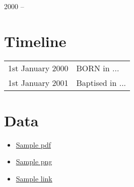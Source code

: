 \begin{center}
\huge{2000 --}
\end{center}

\vspace{1in}

\begin{center}
\end{center}

\newpage
\section{Timeline}
\begin{table}[h]
\renewcommand\arraystretch{1.4}
\begin{tabular}{@{\,}r <{\hskip 2pt} !{\foo} >{\raggedright\arraybackslash}p{20cm}}
\addlinespace[1.5ex]
1st January 2000 & BORN in ...\\
1st January 2001 & Baptised in ... \\
\end{tabular}
\end{table}

\section{Data}
\begin{itemize}
\item \href{run:people/Child2/sample.pdf}{Sample pdf}
\item \href{run:people/Child2/sample.png}{Sample png}
\item \href{https://github.com/StevenElsworth?tab=repositories}{Sample link} 
\end{itemize}
